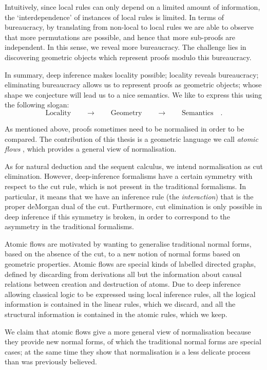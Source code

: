 Intuitively, since local rules can only depend on a limited amount of information, the `interdependence' of instances of local rules is limited. In terms of bureaucracy, by translating from non-local to local rules we are able to observe that more permutations are possible, and hence that more sub-proofs are independent. In this sense, we reveal more bureaucracy. The challenge lies in discovering geometric objects which represent proofs modulo this bureaucracy.

In summary, deep inference makes locality possible; locality reveals bureaucracy; eliminating bureaucracy allows us to represent proofs as geometric objects; whose shape we conjecture will lead us to a nice semantics. We like to express this using the following slogan:
\[
\mbox{Locality}\qquad\rightarrow\qquad\mbox{Geometry}\qquad\rightarrow\qquad\mbox{Semantics}\quad.
\]

As mentioned above, proofs sometimes need to be normalised in order to be compared. The contribution of this thesis is a geometric language we call \emph{atomic flows} \cite{GuglGund:07:Normalis:lr}, which provides a general view of normalisation.

As for natural deduction and the sequent calculus, we intend normalisation as cut elimination. However, deep-inference formalisms have a certain symmetry with respect to the cut rule, which is not present in the traditional formalisms. In particular, it means that we have an inference rule (the \emph{interaction}) that is the proper deMorgan dual of the cut. Furthermore, cut elimination is only possible in deep inference if this symmetry is broken, in order to correspond to the asymmetry in the traditional formalisms.

Atomic flows are motivated by wanting to generalise traditional normal forms, based on the absence of the cut, to a new notion of normal forms based on geometric properties. Atomic flows are special kinds of labelled directed graphs, defined by discarding from derivations all but the information about causal relations between creation and destruction of atoms. Due to deep inference allowing classical logic to be expressed using local inference rules, all the logical information is contained in the linear rules, which we discard, and all the structural information is contained in the atomic rules, which we keep.

We claim that atomic flows give a more general view of normalisation because they provide new normal forms, of which the traditional normal forms are special cases; at the same time they show that normalisation is a less delicate process than was previously believed.

